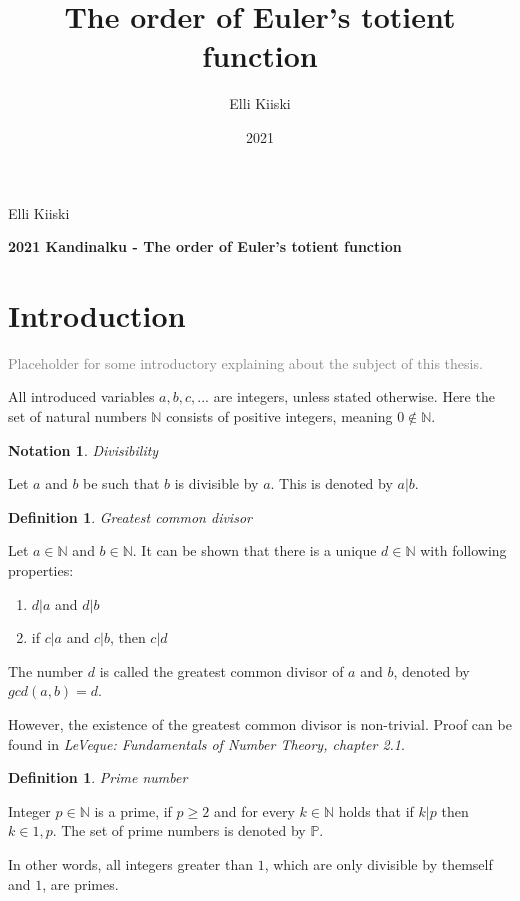 \documentclass{article}
\title{The order of Euler's totient function}
\author{Elli Kiiski}
\date{2021}
\theoremstyle{definition}
\newtheorem{definition}[subsubsection]{Definition}
\newtheorem{notation}[subsubsection]{Notation}
\begin{document}
{\large
Elli Kiiski
\par
\textbf{2021 Kandinalku - The order of Euler's totient function}
}
\vspace{0.5cm}

\section{Introduction}

\textcolor{gray}{Placeholder for some introductory explaining about the subject of this thesis.}

All introduced variables $a, b, c, ...$ are integers, unless stated otherwise. Here the set of natural numbers $\mathbb{N}$ consists of positive integers, meaning $0 \not\in \mathbb{N}$.

\begin{notation}{\emph{Divisibility}}

Let $a$ and $b$ be such that $b$ is divisible by $a$. This is denoted by $a \vert b$.

\end{notation}

\begin{definition}{\emph{Greatest common divisor}}

Let $a \in \mathbb{N}$ and $b \in \mathbb{N}$. It can be shown that there is a unique $d \in \mathbb{N}$ with following properties:

\begin{enumerate}
 \item $d \vert a$ and $d \vert b$
 \item if $c \vert a$ and $c \vert b$, then $c \vert d$
\end{enumerate}

The number $d$ is called the greatest common divisor of $a$ and $b$, denoted by $gcd(a,b) = d$.

However, the existence of the greatest common divisor is non-trivial. Proof can be found in \textit{LeVeque: Fundamentals of Number Theory, chapter 2.1}.

\end{definition}

\begin{definition}{\emph{Prime number}}

Integer $p\in\mathbb{N}$ is a prime, if $p \geq 2$ and for every $k\in\mathbb{N}$ holds that if $k \vert p$ then $k\in{1, p}$. The set of prime numbers is denoted by $\mathbb{P}$.

In other words, all integers greater than $1$, which are only divisible by themself and $1$, are primes.


\end{definition}
\end{document}
